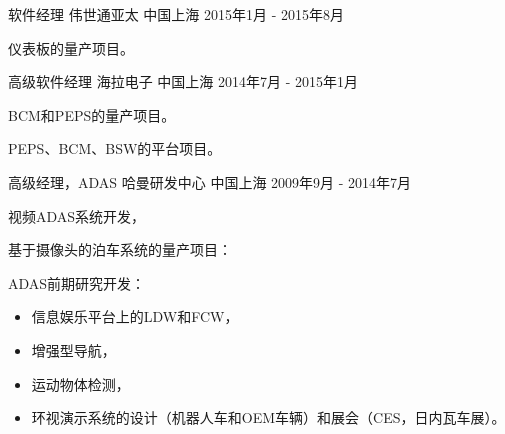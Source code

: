 \documentclass[../cv_cn.tex]{subfiles}
\begin{document}
\begin{cventries}
	\cventry
	{软件经理} %
	{伟世通亚太} %
	{中国上海} %
	{2015年1月 - 2015年8月} %
	{
		\begin{cvitems}
			\item 仪表板的量产项目。
		\end{cvitems}
	}

	\cventry
	{高级软件经理} %
	{海拉电子} %
	{中国上海} %
	{2014年7月 - 2015年1月} %
	{
		\begin{cvitems}
			\item BCM和PEPS的量产项目。
			\item PEPS、BCM、BSW的平台项目。
		\end{cvitems}
	}

	\cventry
	{高级经理，ADAS} %
	{哈曼研发中心} %
	{中国上海} %
	{2009年9月 - 2014年7月} %
	{
		\begin{cvitems}
			\item 视频ADAS系统开发，
			\item 基于摄像头的泊车系统的量产项目：
			\item ADAS前期研究开发：
			\begin{itemize}
				\item 信息娱乐平台上的LDW和FCW，
				\item 增强型导航，
				\item 运动物体检测，
				\item 环视演示系统的设计（机器人车和OEM车辆）和展会（CES，日内瓦车展）。
			\end{itemize}
		\end{cvitems}
	}
\end{cventries}
\end{document}
